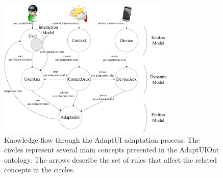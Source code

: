 \begin{figure}[H]
\centering
\includegraphics[width=0.75\textwidth]{flow_diagram.pdf}
\caption{Knowledge flow through the AdaptUI adaptation process. The circles
represent several main concepts presented in the AdaptUIOnt ontology. The arrows
describe the set of rules that affect the related concepts in the circles.}
\label{fig:flow_diagram}
\end{figure}



